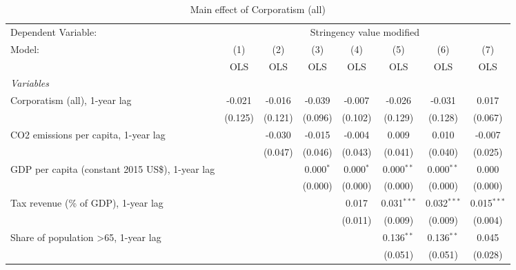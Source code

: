 
\begin{table}[htbp]
   \caption{Main effect of Corporatism (all)}
   \centering
   \begin{tabular}{lccccccc}
      \toprule
      Dependent Variable: & \multicolumn{7}{c}{Stringency value modified}\\
      Model:                                                & (1)     & (2)     & (3)         & (4)         & (5)           & (6)           & (7)\\  
                                                            &  OLS    & OLS     & OLS         & OLS         & OLS           & OLS           & OLS\\  
      \midrule
      \emph{Variables}\\
      Corporatism (all), 1-year lag                         & -0.021  & -0.016  & -0.039      & -0.007      & -0.026        & -0.031        & 0.017\\   
                                                            & (0.125) & (0.121) & (0.096)     & (0.102)     & (0.129)       & (0.128)       & (0.067)\\   
      CO2 emissions per capita, 1-year lag                  &         & -0.030  & -0.015      & -0.004      & 0.009         & 0.010         & -0.007\\   
                                                            &         & (0.047) & (0.046)     & (0.043)     & (0.041)       & (0.040)       & (0.025)\\   
      GDP per capita (constant 2015 US\$), 1-year lag       &         &         & 0.000$^{*}$ & 0.000$^{*}$ & 0.000$^{**}$  & 0.000$^{**}$  & 0.000\\   
                                                            &         &         & (0.000)     & (0.000)     & (0.000)       & (0.000)       & (0.000)\\   
      Tax revenue (\% of GDP), 1-year lag                   &         &         &             & 0.017       & 0.031$^{***}$ & 0.032$^{***}$ & 0.015$^{***}$\\   
                                                            &         &         &             & (0.011)     & (0.009)       & (0.009)       & (0.004)\\   
      Share of population >65, 1-year lag                   &         &         &             &             & 0.136$^{**}$  & 0.136$^{**}$  & 0.045\\   
                                                            &         &         &             &             & (0.051)       & (0.051)       & (0.028)\\   

\end{tabular}
\end{table}
